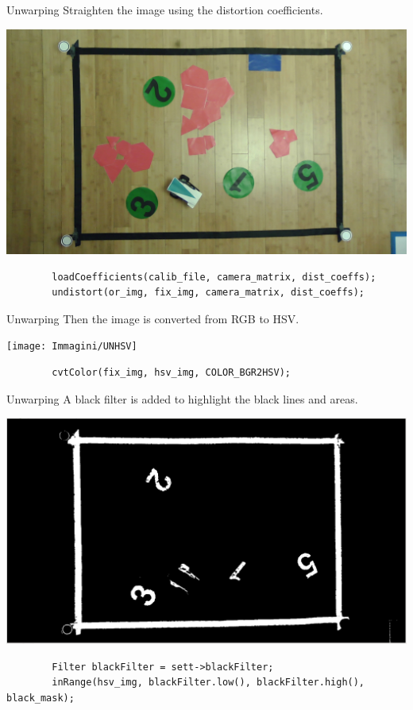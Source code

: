 \begin{frame}[fragile]{Unwarping}
	Straighten the image using the distortion coefficients. 
	\begin{center}
		\includegraphics[scale=0.15]{Immagini/Undistorted}	
	\end{center}
	\begin{verbatim}
		loadCoefficients(calib_file, camera_matrix, dist_coeffs);
		undistort(or_img, fix_img, camera_matrix, dist_coeffs);
	\end{verbatim}
\end{frame}

\begin{frame}[fragile]{Unwarping}
	Then the image is converted from RGB to HSV.
	\begin{center}
		\texttt{[image: Immagini/UNHSV]}
	\end{center}
	\vfill
	\begin{verbatim}
		cvtColor(fix_img, hsv_img, COLOR_BGR2HSV);
	\end{verbatim}
	\vfill
\end{frame}

\begin{frame}[fragile]{Unwarping}
	A black filter is added to highlight the black lines and areas.
	\begin{center}
		\includegraphics[scale=0.15]{Immagini/UNBlackFilter}
	\end{center}
	\vfill	
	\begin{verbatim}
		Filter blackFilter = sett->blackFilter; 
        inRange(hsv_img, blackFilter.low(), blackFilter.high(), black_mask);
	\end{verbatim}
	\vfill
\end{frame}

